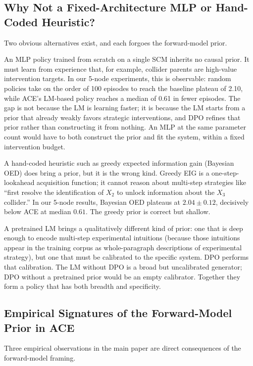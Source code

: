 \subsection{Why Not a Fixed-Architecture MLP or Hand-Coded Heuristic?}

Two obvious alternatives exist, and each forgoes the forward-model prior.

An MLP policy trained from scratch on a single SCM inherits no causal prior. It must learn from experience that, for example, collider parents are high-value intervention targets. In our 5-node experiments, this is observable: random policies take on the order of 100 episodes to reach the baseline plateau of 2.10, while ACE's LM-based policy reaches a median of 0.61 in fewer episodes. The gap is not because the LM is learning faster; it is because the LM starts from a prior that already weakly favors strategic interventions, and DPO refines that prior rather than constructing it from nothing. An MLP at the same parameter count would have to both construct the prior and fit the system, within a fixed intervention budget.

A hand-coded heuristic such as greedy expected information gain (Bayesian OED) does bring a prior, but it is the wrong kind. Greedy EIG is a one-step-lookahead acquisition function; it cannot reason about multi-step strategies like ``first resolve the identification of $X_2$ to unlock information about the $X_3$ collider.'' In our 5-node results, Bayesian OED plateaus at $2.04 \pm 0.12$, decisively below ACE at median $0.61$. The greedy prior is correct but shallow.

A pretrained LM brings a qualitatively different kind of prior: one that is deep enough to encode multi-step experimental intuitions (because those intuitions appear in the training corpus as whole-paragraph descriptions of experimental strategy), but one that must be calibrated to the specific system. DPO performs that calibration. The LM without DPO is a broad but uncalibrated generator; DPO without a pretrained prior would be an empty calibrator. Together they form a policy that has both breadth and specificity.

\subsection{Empirical Signatures of the Forward-Model Prior in ACE}

Three empirical observations in the main paper are direct consequences of the forward-model framing.

